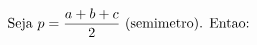 \documentclass[preview]{standalone}
\begin{document}
\begin{align*}
\special{dvisvgm:raw <g id='unique000'>}\text{Seja } p = \frac{a+b+c}{2} \text{ (semimetro). Entao:}\special{dvisvgm:raw </g>}
\end{align*}
\end{document}
